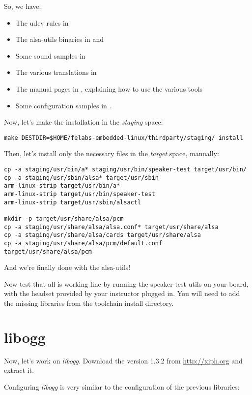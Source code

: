 So, we have:
\begin{itemize}
\item The udev rules in 
\item The alsa-utils binaries in  and 
\item Some sound samples in 
\item The various translations in 
\item The manual pages in , explaining how to
  use the various tools
\item Some configuration samples in .
\end{itemize}

Now, let's make the installation in the {\em staging} space:

\begin{verbatim}
make DESTDIR=$HOME/felabs-embedded-linux/thirdparty/staging/ install
\end{verbatim}

Then, let's install only the necessary files in the {\em target}
space, manually:

\begin{verbatim}
cp -a staging/usr/bin/a* staging/usr/bin/speaker-test target/usr/bin/
cp -a staging/usr/sbin/alsa* target/usr/sbin
arm-linux-strip target/usr/bin/a*
arm-linux-strip target/usr/bin/speaker-test
arm-linux-strip target/usr/sbin/alsactl

mkdir -p target/usr/share/alsa/pcm
cp -a staging/usr/share/alsa/alsa.conf* target/usr/share/alsa
cp -a staging/usr/share/alsa/cards target/usr/share/alsa
cp -a staging/usr/share/alsa/pcm/default.conf target/usr/share/alsa/pcm
\end{verbatim}

And we're finally done with the alsa-utils!

Now test that all is working fine by running the speaker-test utils on
your board, with the headset provided by your instructor plugged
in. You will need to add the missing libraries from the toolchain
install directory.

\section{libogg}

Now, let's work on {\em libogg}. Download the version 1.3.2 from
\url{http://xiph.org} and extract it.

Configuring {\em libogg} is very similar to the configuration of the
previous libraries:

